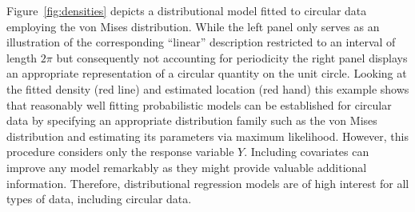 \documentclass[nojss]{jss}
\numberwithin{equation}{section}
\begin{document}
Figure~\ref{fig:densities} depicts a distributional model fitted to circular data
employing the von Mises distribution. While the left panel only serves as an illustration 
of the corresponding  ``linear'' description restricted to an interval of length $2\pi$ but 
consequently not accounting for periodicity the right panel displays an appropriate 
representation of a circular quantity on the unit circle. 
Looking at the fitted density (red line) and estimated location (red hand) this example 
shows that reasonably well fitting probabilistic models can be established for circular 
data by specifying an appropriate distribution family such as the von Mises distribution
and estimating its parameters via maximum likelihood. 
However, this procedure considers only the response variable $Y$. Including covariates 
can improve any model remarkably as they might provide valuable additional information.
Therefore, distributional regression models are of high interest for all types of data,
including circular data.
\end{document}
